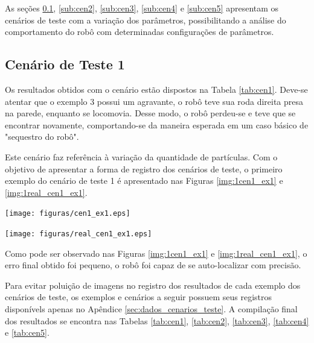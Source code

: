 As seções \ref{sub:cen1}, \ref{sub:cen2}, \ref{sub:cen3}, \ref{sub:cen4} e \ref{sub:cen5} apresentam os cenários de teste com a variação dos parâmetros, possibilitando a análise do comportamento do robô
com determinadas configurações de parâmetros.

\subsection{Cenário de Teste 1}
\label{sub:cen1}

Os resultados obtidos com o cenário estão dispostos na Tabela \ref{tab:cen1}. Deve-se atentar que o exemplo 3 possui um agravante, o
robô teve sua roda direita presa na parede, enquanto se locomovia. Desse modo, o robô perdeu-se e teve que se encontrar novamente, comportando-se
da maneira esperada em um caso básico de "sequestro do robô".

Este cenário faz referência à variação da quantidade de partículas. Com o objetivo de apresentar a forma de registro dos cenários de teste,
o primeiro exemplo do cenário de teste 1 é apresentado nas Figuras \ref{img:1cen1_ex1} e \ref{img:1real_cen1_ex1}.

{\centering
\texttt{[image: figuras/cen1\_ex1.eps]}
\label{img:1cen1_ex1}
\par}

{\centering
\texttt{[image: figuras/real\_cen1\_ex1.eps]}
\label{img:1real_cen1_ex1}
\par}

Como pode ser observado nas Figuras \ref{img:1cen1_ex1} e \ref{img:1real_cen1_ex1}, o erro final obtido foi pequeno, o robô foi capaz
de se auto-localizar com precisão.

Para evitar poluição de imagens no registro dos resultados de cada exemplo dos cenários de teste, os exemplos e cenários a seguir
possuem seus registros disponívels apenas no Apêndice \ref{sec:dados_cenarios_teste}. A compilação final dos resultados se encontra nas Tabelas
\ref{tab:cen1}, \ref{tab:cen2}, \ref{tab:cen3}, \ref{tab:cen4} e \ref{tab:cen5}.


